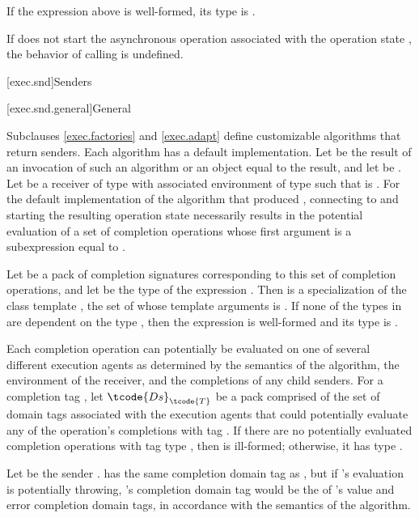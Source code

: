 \mandates
If the expression above is well-formed, its type is .

\pnum
If  does not start
the asynchronous operation associated with the operation state ,
the behavior of calling  is undefined.

[exec.snd]{Senders}

[exec.snd.general]{General}

\pnum
Subclauses \ref{exec.factories} and \ref{exec.adapt} define
customizable algorithms that return senders.
Each algorithm has a default implementation.
Let  be the result of an invocation of such an algorithm or
an object equal to the result, and
let  be .
Let  be a receiver of type 
with associated environment  of type 
such that  is .
For the default implementation of the algorithm that produced ,
connecting  to  and
starting the resulting operation state
necessarily results in the potential evaluation of
a set of completion operations
whose first argument is a subexpression equal to .

\pnum
Let  be a pack of completion signatures corresponding to
this set of completion operations, and
let  be
the type of the expression .
Then  is
a specialization of
the class template ,
the set of whose template arguments is .
If none of the types in  are dependent on the type , then
the expression  is well-formed and
its type is .

\pnum
Each completion operation can potentially be evaluated
on one of several different execution agents
as determined by the semantics of the algorithm,
the environment of the receiver, and
the completions of any child senders.
For a completion tag ,
let $\tcode{Ds}_{\tcode{T}}$ be a pack comprised of the set of domain tags
associated with the execution agents that could potentially evaluate
any of the operation's completions with tag .
If there are no potentially evaluated completion operations
with tag type ,
then  is ill-formed;
otherwise, it has type
.
\begin{example}
Let  be the sender .
 has the same  completion domain tag as ,
but if 's evaluation is potentially throwing,
's  completion domain tag would be
the  of 's value and error completion domain tags,
in accordance with the semantics of the  algorithm.
\end{example}

